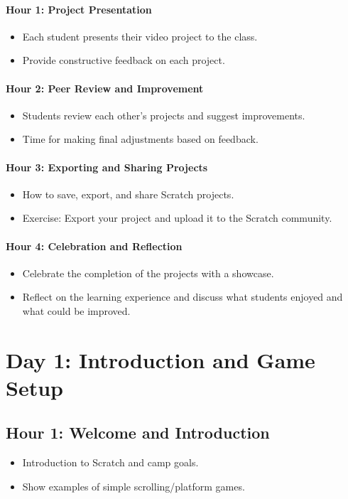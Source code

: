 \documentclass[main.tex]{subfiles}
\begin{document}
\paragraph{Hour 1: Project Presentation}
\begin{itemize}
  \item Each student presents their video project to the class.
  \item Provide constructive feedback on each project.
\end{itemize}

\paragraph{Hour 2: Peer Review and Improvement}
\begin{itemize}
  \item Students review each other’s projects and suggest improvements.
  \item Time for making final adjustments based on feedback.
\end{itemize}

\paragraph{Hour 3: Exporting and Sharing Projects}
\begin{itemize}
  \item How to save, export, and share Scratch projects.
  \item Exercise: Export your project and upload it to the Scratch community.
\end{itemize}

\paragraph{Hour 4: Celebration and Reflection}
\begin{itemize}
  \item Celebrate the completion of the projects with a showcase.
  \item Reflect on the learning experience and discuss what students enjoyed and what could be improved.
\end{itemize}


\section*{Day 1: Introduction and Game Setup}
\subsection*{Hour 1: Welcome and Introduction}
\begin{itemize}
    \item Introduction to Scratch and camp goals.
    \item Show examples of simple scrolling/platform games.
\end{itemize}
\end{document}
